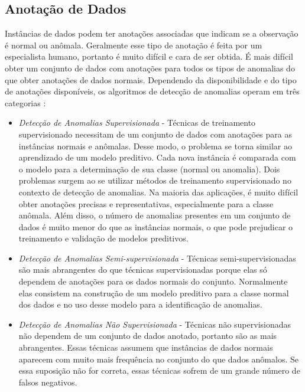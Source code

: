 \documentclass[cic,tc]{iiufrgs}
\begin{document}
\subsection{Anotação de Dados}
Instâncias de dados podem ter anotações associadas que indicam se a observação é normal ou anômala. Geralmente esse tipo de anotação é feita por um especialista humano, portanto é muito difícil e cara de ser obtida. É mais difícil obter um conjunto de dados com anotações para todos os tipos de anomalias do que obter anotações de dados normais. Dependendo da disponibilidade e do tipo de anotações disponíveis, os algoritmos de detecção de anomalias operam em três categorias \cite{AnomalyDetectionSurvey2009}:

\begin{itemize}
    
    \item \textit{Detecção de Anomalias Supervisionada} - Técnicas de treinamento supervisionado necessitam de um conjunto de dados com anotações para as instâncias normais e anômalas. Desse modo, o problema se torna similar ao aprendizado de um modelo preditivo. Cada nova instância é comparada com o modelo para a determinação de sua classe (normal ou anomalia). Dois problemas surgem ao se utilizar métodos de treinamento supervisionado no contexto de detecção de anomalias. Na maioria das aplicações, é muito difícil obter anotações precisas e representativas, especialmente para a classe anômala. Além disso, o número de anomalias presentes em um conjunto de dados é muito menor do que as instâncias normais, o que pode prejudicar o treinamento e validação de modelos preditivos.

    \item \textit{Detecção de Anomalias Semi-supervisionada} - Técnicas semi-supervisionadas são mais abrangentes do que técnicas supervisionadas porque elas só dependem de anotações para os dados normais do conjunto. Normalmente elas consistem na construção de um modelo preditivo para a classe normal dos dados e no uso desse modelo para a identificação de anomalias.

    \item \textit{Detecção de Anomalias Não Supervisionada} - Técnicas não supervisionadas não dependem de um conjunto de dados anotado, portanto são as mais abrangentes. Essas técnicas assumem que instâncias de dados normais aparecem com muito mais frequência no conjunto do que dados anômalos. Se essa suposição não for correta, essas técnicas sofrem de um grande número de falsos negativos.

\end{itemize}
\end{document}
